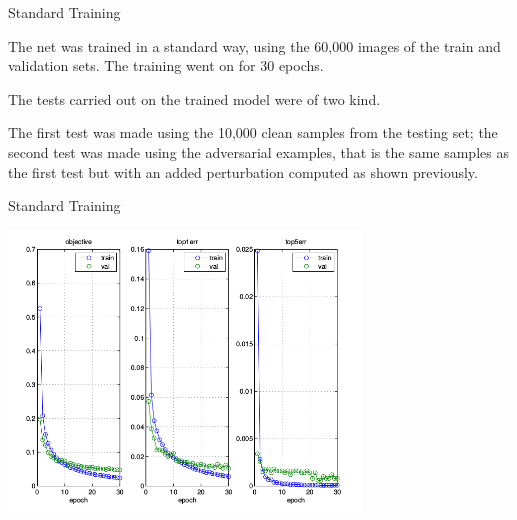 \begin{tframe}{Standard Training}

The net was trained in a standard way, using the 60,000 images of the train and validation sets. The training went on for 30 epochs.

\vspace{0.1in}

The tests carried out on the trained model were of two kind. 

\vspace{0.1in}

The first test was made using the 10,000 clean samples from the testing set; the second test was made using the adversarial examples, that is the same samples as the first test but with an added perturbation computed as shown previously.

\end{tframe}

\begin{tframe}{Standard Training}

\begin{center}
  \includegraphics[width=0.7\textwidth]{img/train-base.png}
	\label{train-base} 
\end{center}
\end{tframe}

